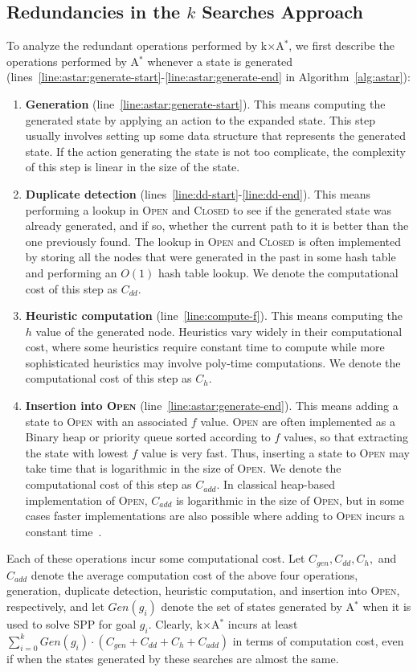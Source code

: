 \documentclass{aicom2e}
\newcommand{\astar}{A$^*$}
\newcommand{\kxastar}{k$\times$A$^*$}
\newcommand{\open}{\textsc{Open}}
\newcommand{\closed}{\textsc{Closed}}
\begin{document}
\subsection{Redundancies in the $k$ Searches Approach}

To analyze the redundant operations performed by \kxastar{}, we first describe the operations performed by \astar{} whenever a state is generated (lines~\ref{line:astar:generate-start}-\ref{line:astar:generate-end} in Algorithm~\ref{alg:astar}):
\begin{enumerate}
\item {\bf Generation}  (line~\ref{line:astar:generate-start}). This means computing the generated state by applying 
an action to the expanded state. This step usually involves setting up some data structure that represents the generated state. If the action generating the state is not too complicate, the complexity of this step is linear in the size of the state. 
\item {\bf Duplicate detection}  (lines~\ref{line:dd-start}-\ref{line:dd-end}). This means performing a lookup in \open{} and \closed{} to see if the generated state was already generated, and if so, whether the current path to it is better than the one previously found. The lookup in \open{} and \closed{} is often implemented by storing all the nodes that were generated in the past in some hash table and performing an $O(1)$ hash table lookup. We denote the computational cost of this step as $C_{dd}$. 
\item {\bf Heuristic computation}  (line~\ref{line:compute-f}). This means computing the $h$ value of the generated node. Heuristics vary widely in their computational cost, where some heuristics require constant time to compute while more sophisticated heuristics may involve poly-time computations. We denote the computational cost of this step as $C_{h}$. 
\item {\bf Insertion into \open{}}  (line~\ref{line:astar:generate-end}). This means adding a state to \open{} with an associated $f$ value. \open{} are often implemented as a Binary heap or priority queue sorted according to $f$ values, so that extracting the state with lowest $f$ value is very fast. Thus, inserting a state to \open{} may take time that is logarithmic in the size of \open{}. We denote the computational cost of this step as $C_{add}$. In classical heap-based implementation of \open{}, $C_{add}$ is logarithmic in the size of \open{}, but in some cases faster implementations are also possible where adding to \open{} incurs a constant time~\cite{GILON2016,BurnsHLR12}.
\end{enumerate}
Each of these operations incur some computational cost. Let $C_{gen}, C_{dd}, C_{h},$ and $C_{add}$ denote the average computation cost 
of the above four operations, generation, duplicate detection, heuristic computation, and insertion into \open{}, respectively, 
and let $Gen(g_i)$ denote the set of states generated by \astar{} when it is used to solve SPP for goal $g_i$.  
Clearly, \kxastar{} incurs at least $\sum_{i=0}^k Gen(g_i)\cdot(C_{gen}+C_{dd}+C_{h}+C_{add})$ in terms of computation cost, 
even if when the states generated by these searches are almost the same. 
\end{document}
